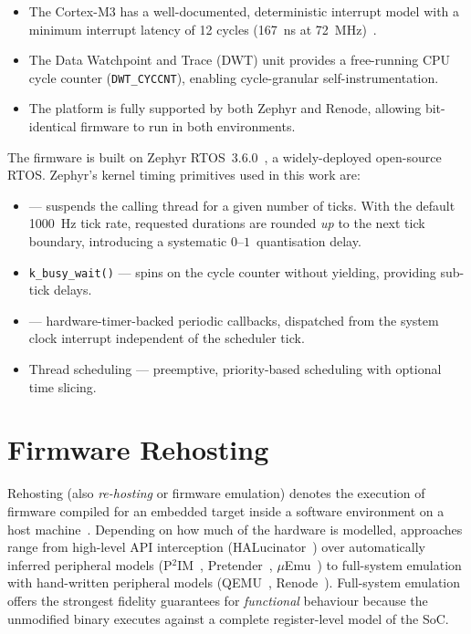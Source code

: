 \begin{itemize}
  \item The Cortex-M3 has a well-documented, deterministic interrupt
        model with a minimum interrupt latency of 12 cycles
        (\SI{167}{\nano\second} at \SI{72}{\mega\hertz})~\cite{armcm3trm}.
  \item The Data Watchpoint and Trace (DWT) unit provides a free-running
        CPU cycle counter (\texttt{DWT\_CYCCNT}), enabling
        cycle-granular self-instrumentation.
  \item The platform is fully supported by both Zephyr and Renode,
        allowing bit-identical firmware to run in both environments.
\end{itemize}

The firmware is built on Zephyr RTOS~3.6.0~\cite{zephyr}, a
widely-deployed open-source RTOS. Zephyr's kernel timing primitives
used in this work are:

\begin{itemize}
  \item \ksleep{} --- suspends the calling thread for a given number of
        ticks. With the default \SI{1000}{\hertz} tick rate, requested
        durations are rounded \emph{up} to the next tick boundary,
        introducing a systematic $0$--$1$\,\ms{} quantisation delay.
  \item \texttt{k\_busy\_wait()} --- spins on the cycle counter without
        yielding, providing sub-tick delays.
  \item \ktimer{} --- hardware-timer-backed periodic callbacks,
        dispatched from the system clock interrupt independent of the
        scheduler tick.
  \item Thread scheduling --- preemptive, priority-based scheduling
        with optional time slicing.
\end{itemize}

\section{Firmware Rehosting}
\label{sec:bg:rehosting}

Rehosting (also \emph{re-hosting} or firmware emulation) denotes the
execution of firmware compiled for an embedded target inside a
software environment on a host machine~\cite{fasano2021sok}. Depending
on how much of the hardware is modelled, approaches range from
high-level API interception (HALucinator~\cite{clements2020halucinator})
over automatically inferred peripheral models
(P$^2$IM~\cite{feng2020p2im}, Pretender~\cite{gustafson2019pretender},
$\mu$Emu~\cite{zhou2021uemu}) to full-system emulation with hand-written
peripheral models (QEMU~\cite{bellard2005qemu}, Renode~\cite{renode}).
Full-system emulation offers the strongest fidelity guarantees for
\emph{functional} behaviour because the unmodified binary executes
against a complete register-level model of the SoC.

